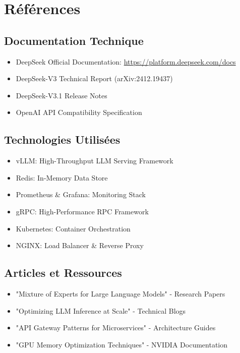 \documentclass[12pt,a4paper]{article}
\begin{document}
\newpage
\section{Références}

\subsection{Documentation Technique}

\begin{itemize}[leftmargin=2cm]
    \item DeepSeek Official Documentation: \url{https://platform.deepseek.com/docs}
    \item DeepSeek-V3 Technical Report (arXiv:2412.19437)
    \item DeepSeek-V3.1 Release Notes
    \item OpenAI API Compatibility Specification
\end{itemize}

\subsection{Technologies Utilisées}

\begin{itemize}[leftmargin=2cm]
    \item vLLM: High-Throughput LLM Serving Framework
    \item Redis: In-Memory Data Store
    \item Prometheus \& Grafana: Monitoring Stack
    \item gRPC: High-Performance RPC Framework
    \item Kubernetes: Container Orchestration
    \item NGINX: Load Balancer \& Reverse Proxy
\end{itemize}

\subsection{Articles et Ressources}

\begin{itemize}[leftmargin=2cm]
    \item "Mixture of Experts for Large Language Models" - Research Papers
    \item "Optimizing LLM Inference at Scale" - Technical Blogs
    \item "API Gateway Patterns for Microservices" - Architecture Guides
    \item "GPU Memory Optimization Techniques" - NVIDIA Documentation
\end{itemize}
\end{document}
